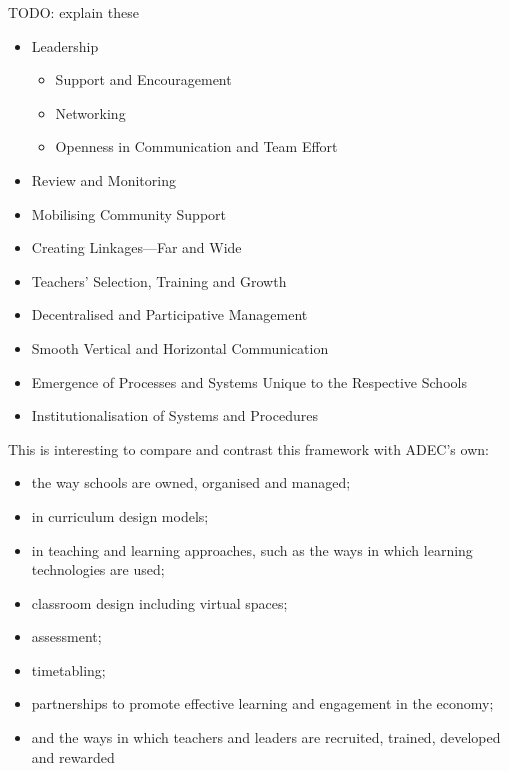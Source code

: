 TODO: explain these
\begin{itemize}
\item Leadership
    \begin{itemize}
    \item Support and Encouragement
    \item Networking
    \item Openness in Communication and Team Effort
    \end{itemize}
\item Review and Monitoring
\item Mobilising Community Support
\item Creating Linkages—Far and Wide
\item Teachers’ Selection, Training and Growth
\item Decentralised and Participative Management
\item Smooth Vertical and Horizontal Communication
\item Emergence of Processes and Systems Unique to the Respective Schools
\item Institutionalisation of Systems and Procedures
\end{itemize}

This is interesting to compare and contrast this framework with ADEC's own:

\begin{itemize}
\item the way schools are owned, organised and managed; 
\item in curriculum design models; 
\item in teaching and learning approaches, such as the ways in which learning technologies are used; 
\item classroom design including virtual spaces; 
\item assessment; 
\item timetabling; 
\item partnerships to promote effective learning and engagement in the economy; 
\item and the ways in which teachers and leaders are recruited, trained, developed and rewarded
\end{itemize}

